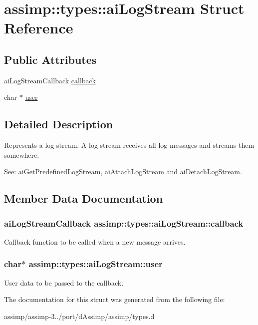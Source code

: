 \hypertarget{structassimp_1_1types_1_1ai_log_stream}{\section{assimp\+:\+:types\+:\+:ai\+Log\+Stream Struct Reference}
\label{structassimp_1_1types_1_1ai_log_stream}
}
\subsection*{Public Attributes}
\begin{DoxyCompactItemize}
\item 
ai\+Log\+Stream\+Callback \hyperlink{structassimp_1_1types_1_1ai_log_stream_a08dd3822cc1246ae66cb922526ec6197}{callback}
\item 
char $\ast$ \hyperlink{structassimp_1_1types_1_1ai_log_stream_a6da3043bc2cdf42675500ffb4e8861f1}{user}
\end{DoxyCompactItemize}


\subsection{Detailed Description}
Represents a log stream. A log stream receives all log messages and streams them somewhere.

See\+: {\ttfamily ai\+Get\+Predefined\+Log\+Stream}, {\ttfamily ai\+Attach\+Log\+Stream} and {\ttfamily ai\+Detach\+Log\+Stream}. 

\subsection{Member Data Documentation}
\hypertarget{structassimp_1_1types_1_1ai_log_stream_a08dd3822cc1246ae66cb922526ec6197}{
\subsubsection[{callback}]{\setlength{\rightskip}{0pt plus 5cm}ai\+Log\+Stream\+Callback assimp\+::types\+::ai\+Log\+Stream\+::callback}}\label{structassimp_1_1types_1_1ai_log_stream_a08dd3822cc1246ae66cb922526ec6197}
Callback function to be called when a new message arrives. \hypertarget{structassimp_1_1types_1_1ai_log_stream_a6da3043bc2cdf42675500ffb4e8861f1}{
\subsubsection[{user}]{\setlength{\rightskip}{0pt plus 5cm}char$\ast$ assimp\+::types\+::ai\+Log\+Stream\+::user}}\label{structassimp_1_1types_1_1ai_log_stream_a6da3043bc2cdf42675500ffb4e8861f1}
User data to be passed to the callback. 

The documentation for this struct was generated from the following file\+:\begin{DoxyCompactItemize}
\item 
assimp/assimp-\/3../port/d\+Assimp/assimp/types.\+d\end{DoxyCompactItemize}
